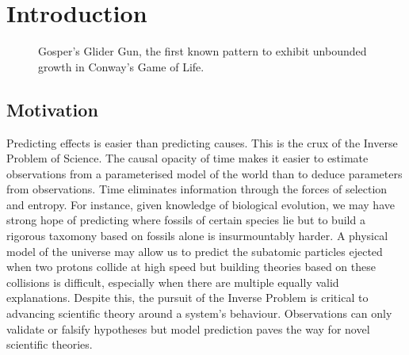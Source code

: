 \chapter{Introduction}

\begin{figure}[!h]
\centering
            \hfill
            \hfill
            \hfill
            \hfill
            \caption{Gosper's Glider Gun, the first known pattern to exhibit unbounded growth in Conway's Game of Life.\cite{hickerson}}
\label{fig:gospers-glider}
\end{figure}

\section{Motivation}
Predicting effects is easier than predicting causes. This is the crux of the Inverse Problem of Science. The causal opacity of time makes it easier to estimate observations from a parameterised model of the world than to deduce parameters from observations. Time eliminates information through the forces of selection and entropy. For instance, given knowledge of biological evolution, we may have strong hope of predicting where fossils of certain species lie but to build a rigorous taxomony based on fossils alone is insurmountably harder. A physical model of the universe may allow us to predict the subatomic particles ejected when two protons collide at high speed but building theories based on these collisions is difficult, especially when there are multiple equally valid explanations. Despite this, the pursuit of the Inverse Problem is critical to advancing scientific theory around a system's behaviour. Observations can only validate or falsify hypotheses but model prediction paves the way for novel scientific theories.\\


